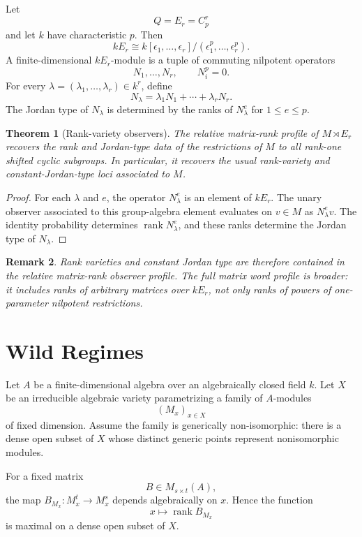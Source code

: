 \documentclass[11pt]{article}
\newtheorem{theorem}{Theorem}[section]
\newtheorem{remark}[theorem]{Remark}
\begin{document}
Let
\[
Q=E_r=C_p^r
\]
and let $k$ have characteristic $p$. Then
\[
kE_r\cong k[\epsilon_1,\ldots,\epsilon_r]/(\epsilon_1^p,\ldots,\epsilon_r^p).
\]
A finite-dimensional $kE_r$-module is a tuple of commuting nilpotent operators
\[
N_1,\ldots,N_r,
\qquad
N_i^p=0.
\]
For every $\lambda=(\lambda_1,\ldots,\lambda_r)\in k^r$, define
\[
N_\lambda=\lambda_1N_1+\cdots+\lambda_rN_r.
\]
The Jordan type of $N_\lambda$ is determined by the ranks of $N_\lambda^e$ for $1\le e\le p$.

\begin{theorem}[Rank-variety observers]
The relative matrix-rank profile of $M\rtimes E_r$ recovers the rank and Jordan-type data of the restrictions of $M$ to all rank-one shifted cyclic subgroups. In particular, it recovers the usual rank-variety and constant-Jordan-type loci associated to $M$.
\end{theorem}

\begin{proof}
For each $\lambda$ and $e$, the operator $N_\lambda^e$ is an element of $kE_r$. The unary observer associated to this group-algebra element evaluates on $v\in M$ as $N_\lambda^ev$. The identity probability determines $\operatorname{rank}N_\lambda^e$, and these ranks determine the Jordan type of $N_\lambda$.
\end{proof}

\begin{remark}
Rank varieties and constant Jordan type are therefore contained in the relative matrix-rank observer profile. The full matrix word profile is broader: it includes ranks of arbitrary matrices over $kE_r$, not only ranks of powers of one-parameter nilpotent restrictions.
\end{remark}

\section{Wild Regimes}

Let $A$ be a finite-dimensional algebra over an algebraically closed field $k$. Let $X$ be an irreducible algebraic variety parametrizing a family of $A$-modules
\[
(M_x)_{x\in X}
\]
of fixed dimension. Assume the family is generically non-isomorphic: there is a dense open subset of $X$ whose distinct generic points represent nonisomorphic modules.

For a fixed matrix
\[
B\in M_{s\times t}(A),
\]
the map $B_{M_x}:M_x^t\to M_x^s$ depends algebraically on $x$. Hence the function
\[
x\mapsto \operatorname{rank}B_{M_x}
\]
is maximal on a dense open subset of $X$.
\end{document}
